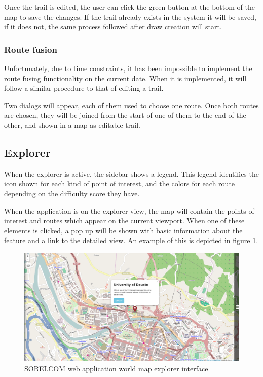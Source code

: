 Once the trail is edited, the user can click the green button at the bottom of the map to save the changes. If the trail already exists in the system it will be saved, if it does not, the same process followed after draw creation will start.

\subsubsection*{Route fusion}

Unfortunately, due to time constraints, it has been impossible to implement the route fusing functionality on the current date. When it is implemented, it will follow a similar procedure to that of editing a trail. 

Two dialogs will appear, each of them used to choose one route. Once both routes are chosen, they will be joined from the start of one of them to the end of the other, and shown in a map as editable trail.

\subsection{Explorer}

When the explorer is active, the sidebar shows a legend. This legend identifies the icon shown for each kind of point of interest, and the colors for each route depending on the difficulty score they have.

When the application is on the explorer view, the map will contain the points of interest and routes which appear on the current viewport. When one of these elements is clicked, a pop up will be shown with basic information about the feature and a link to the detailed view. An example of this is depicted in figure \ref{fig:explorer}.

\begin{figure}[ht]
  \centering
  \includegraphics[width=.75\textwidth]{fig/map-explore-link}
  \caption{SORELCOM web application world map explorer interface}
  \label{fig:explorer}
\end{figure}

